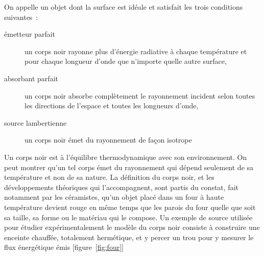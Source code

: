 \sk
On appelle  un objet dont la surface est idéale et satisfait les trois conditions suivantes~:
\begin{description}
\item[émetteur parfait] un corps noir rayonne plus d’énergie radiative à chaque température et pour chaque longueur d’onde que n'importe quelle autre surface,
\item[absorbant parfait] un corps noir absorbe complètement le rayonnement incident selon toutes les directions de l'espace et toutes les longueurs d'onde,
\item[source lambertienne] un corps noir émet du rayonnement de façon isotrope
\end{description}

\sk
Un corps noir est à l'équilibre thermodynamique avec son environnement. On peut montrer qu'un tel corps émet du rayonnement qui dépend seulement de sa température et non de sa nature. La définition du corps noir, et les développements théoriques qui l'accompagnent, sont partis du constat, fait notamment par les céramistes, qu'un objet placé dans un four à haute température devient rouge en même temps que les parois du four quelle que soit sa taille, sa forme ou le matériau qui le compose. Un exemple de source utilisée pour étudier expérimentalement le modèle du corps noir consiste à construire une enceinte chauffée, totalement hermétique, et y percer un trou pour y mesurer le flux énergétique émis [figure~\ref{fig:four}]


